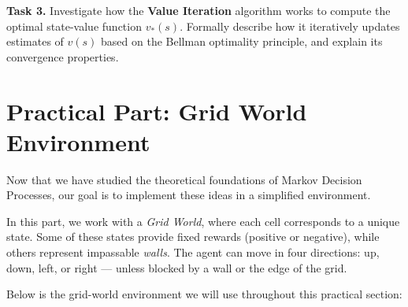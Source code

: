 \documentclass[12pt]{extreport}
\theoremstyle{definition}
\begin{document}
\medskip

\noindent\textbf{Task 3.} Investigate how the \textbf{Value Iteration} algorithm works to compute the optimal state-value function \( v_*(s) \).  
Formally describe how it iteratively updates estimates of \( v(s) \) based on the Bellman optimality principle, and explain its convergence properties.

\bigskip



\section*{Practical Part: Grid World Environment}

Now that we have studied the theoretical foundations of Markov Decision Processes, our goal is to implement these ideas in a simplified environment.

In this part, we work with a \textit{Grid World}, where each cell corresponds to a unique state. Some of these states provide fixed rewards (positive or negative), while others represent impassable \textit{walls}. The agent can move in four directions: up, down, left, or right — unless blocked by a wall or the edge of the grid.

Below is the grid-world environment we will use throughout this practical section:

\begin{center}
\end{center}

\medskip
\end{document}

